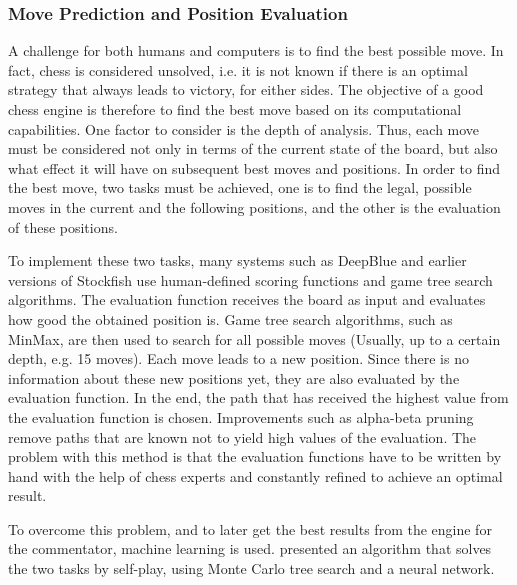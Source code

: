 \subsubsection{Move Prediction and Position Evaluation}

A challenge for both humans and computers is to find the best possible move. In fact, chess is considered unsolved, i.e. it is not known if there is an optimal strategy that always leads to victory, for either sides. The objective of a good chess engine is therefore to find the best move based on its computational capabilities. One factor to consider is the depth of analysis. Thus, each move must be considered not only in terms of the current state of the board, but also what effect it will have on subsequent best moves and positions. In order to find the best move, two tasks must be achieved, one is to find the legal, possible moves in the current and the following positions, and the other is the evaluation of these positions.

To implement these two tasks, many systems such as DeepBlue and earlier versions of Stockfish use human-defined scoring functions and game tree search algorithms. The evaluation function receives the board as input and evaluates how good the obtained position is. Game tree search algorithms, such as MinMax, are then used to search for all possible moves (Usually, up to a certain depth, e.g. 15 moves). Each move leads to a new position. Since there is no information about these new positions yet, they are also evaluated by the evaluation function. In the end, the path that has received the highest value from the evaluation function is chosen. Improvements such as alpha-beta pruning remove paths that are known not to yield high values of the evaluation. The problem with this method is that the evaluation functions have to be written by hand with the help of chess experts and constantly refined to achieve an optimal result.

To overcome this problem, and to later get the best results from the engine for the commentator, machine learning is used. \cite{alphazero-2018} presented an algorithm that solves the two tasks by self-play, using Monte Carlo tree search and a neural network.